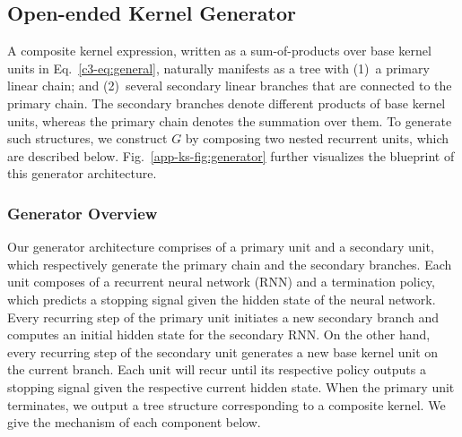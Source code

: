\subsection{Open-ended Kernel Generator}
\label{app-ks-subsec:generator} 
A composite kernel expression, written as a sum-of-products over base kernel units in Eq.~\eqref{c3-eq:general}, naturally manifests as a tree with (1)~a primary linear chain; and (2)~several secondary linear branches that are connected to the primary chain. The secondary branches denote different products of base kernel units, whereas the primary chain denotes the summation over them. To generate such structures, we construct $G$ by composing two nested recurrent units, which are described below. Fig.~\ref{app-ks-fig:generator} further visualizes the blueprint of this generator architecture.
\subsubsection{Generator Overview}
Our generator architecture comprises of a primary unit and a secondary unit, which respectively generate the primary chain and the secondary branches. Each unit composes of a recurrent neural network (RNN) and a termination policy, which predicts a stopping signal given the hidden state of the neural network. Every recurring step of the primary unit initiates a new secondary branch and computes an initial hidden state for the secondary RNN. On the other hand, every recurring step of the secondary unit generates a new base kernel unit on the current branch. Each unit will recur until its respective policy outputs a stopping signal given the respective current hidden state. When the primary unit terminates, we output a tree structure corresponding to a composite kernel. We give the mechanism of each component below.

